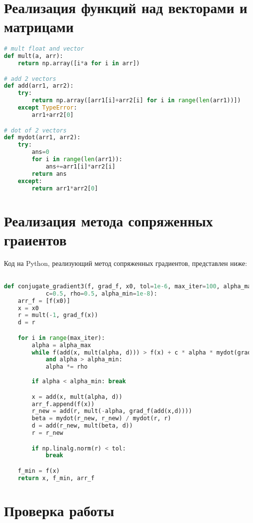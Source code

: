 \documentclass{article}
\begin{document}
\newpage
\section{Реализация функций над векторами и матрицами}
\begin{lstlisting}[language=Python]
# mult float and vector
def mult(a, arr):
    return np.array([i*a for i in arr])

# add 2 vectors
def add(arr1, arr2):
    try:
        return np.array([arr1[i]+arr2[i] for i in range(len(arr1))])
    except TypeError:
        arr1+arr2[0]

# dot of 2 vectors
def mydot(arr1, arr2):
    try:
        ans=0
        for i in range(len(arr1)):
            ans+=arr1[i]*arr2[i]
        return ans
    except:
        return arr1*arr2[0]
\end{lstlisting}


\newpage
\section{Реализация метода сопряженных граиентов}
Код на Python, реализующий метод сопряженных градиентов, представлен ниже:

\begin{lstlisting}[language=Python]

def conjugate_gradient3(f, grad_f, x0, tol=1e-6, max_iter=100, alpha_max=1.0,
			c=0.5, rho=0.5, alpha_min=1e-8):
	arr_f = [f(x0)]
    x = x0
    r = mult(-1, grad_f(x))
    d = r

    for i in range(max_iter):
        alpha = alpha_max
        while f(add(x, mult(alpha, d))) > f(x) + c * alpha * mydot(grad_f(x), d)
        	and alpha > alpha_min:
            alpha *= rho
    
        if alpha < alpha_min: break

        x = add(x, mult(alpha, d))
        arr_f.append(f(x))
        r_new = add(r, mult(-alpha, grad_f(add(x,d))))
        beta = mydot(r_new, r_new) / mydot(r, r)
        d = add(r_new, mult(beta, d))
        r = r_new

        if np.linalg.norm(r) < tol:
            break

    f_min = f(x)
    return x, f_min, arr_f

\end{lstlisting}

\newpage
\section{Проверка работы}
\end{document}
